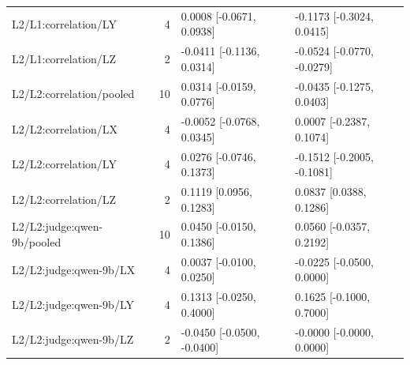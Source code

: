 \begin{longtable}{@{}p{1.8in}rl l@{}}
L2/\allowbreak L1:correlation/\allowbreak LY & 4 & 0.0008 [-0.0671, 0.0938] & -0.1173 [-0.3024, 0.0415]\\
L2/\allowbreak L1:correlation/\allowbreak LZ & 2 & -0.0411 [-0.1136, 0.0314] & -0.0524 [-0.0770, -0.0279]\\
L2/\allowbreak L2:correlation/\allowbreak pooled & 10 & 0.0314 [-0.0159, 0.0776] & -0.0435 [-0.1275, 0.0403]\\
L2/\allowbreak L2:correlation/\allowbreak LX & 4 & -0.0052 [-0.0768, 0.0345] & 0.0007 [-0.2387, 0.1074]\\
L2/\allowbreak L2:correlation/\allowbreak LY & 4 & 0.0276 [-0.0746, 0.1373] & -0.1512 [-0.2005, -0.1081]\\
L2/\allowbreak L2:correlation/\allowbreak LZ & 2 & 0.1119 [0.0956, 0.1283] & 0.0837 [0.0388, 0.1286]\\
L2/\allowbreak L2:judge:qwen-9b/\allowbreak pooled & 10 & 0.0450 [-0.0150, 0.1386] & 0.0560 [-0.0357, 0.2192]\\
L2/\allowbreak L2:judge:qwen-9b/\allowbreak LX & 4 & 0.0037 [-0.0100, 0.0250] & -0.0225 [-0.0500, 0.0000]\\
L2/\allowbreak L2:judge:qwen-9b/\allowbreak LY & 4 & 0.1313 [-0.0250, 0.4000] & 0.1625 [-0.1000, 0.7000]\\
L2/\allowbreak L2:judge:qwen-9b/\allowbreak LZ & 2 & -0.0450 [-0.0500, -0.0400] & -0.0000 [-0.0000, 0.0000]\\
\end{longtable}\endgroup

